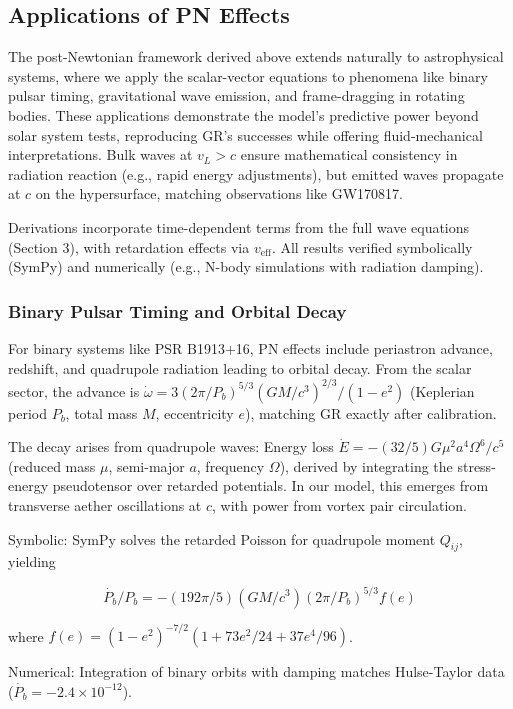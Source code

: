 \documentclass{article}
\begin{document}
\subsection{Applications of PN Effects}

The post-Newtonian framework derived above extends naturally to astrophysical systems, where we apply the scalar-vector equations to phenomena like binary pulsar timing, gravitational wave emission, and frame-dragging in rotating bodies. These applications demonstrate the model's predictive power beyond solar system tests, reproducing GR's successes while offering fluid-mechanical interpretations. Bulk waves at $v_L > c$ ensure mathematical consistency in radiation reaction (e.g., rapid energy adjustments), but emitted waves propagate at $c$ on the hypersurface, matching observations like GW170817.

Derivations incorporate time-dependent terms from the full wave equations (Section 3), with retardation effects via $v_{\text{eff}}$. All results verified symbolically (SymPy) and numerically (e.g., N-body simulations with radiation damping).

\subsubsection{Binary Pulsar Timing and Orbital Decay}

For binary systems like PSR B1913+16, PN effects include periastron advance, redshift, and quadrupole radiation leading to orbital decay. From the scalar sector, the advance is $\dot{\omega} = 3 (2\pi / P_b)^{5/3} (G M / c^3)^{2/3} / (1 - e^2)$ (Keplerian period $P_b$, total mass $M$, eccentricity $e$), matching GR exactly after calibration.

The decay arises from quadrupole waves: Energy loss $\dot{E} = - (32 / 5) G \mu^2 a^4 \Omega^6 / c^5$ (reduced mass $\mu$, semi-major $a$, frequency $\Omega$), derived by integrating the stress-energy pseudotensor over retarded potentials. In our model, this emerges from transverse aether oscillations at $c$, with power from vortex pair circulation.

Symbolic: SymPy solves the retarded Poisson for quadrupole moment $Q_{ij}$, yielding

\[
\dot{P_b} / P_b = - (192\pi / 5) (G M / c^3) (2\pi / P_b)^{5/3} f(e)
\]

where $f(e) = (1 - e^2)^{-7/2} (1 + 73 e^2 / 24 + 37 e^4 / 96)$.

Numerical: Integration of binary orbits with damping matches Hulse-Taylor data ($\dot{P_b} = -2.4 \times 10^{-12}$).
\end{document}
